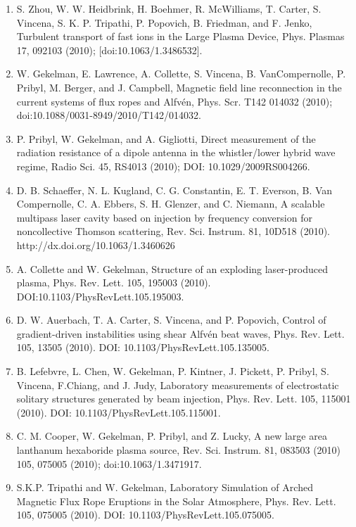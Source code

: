 \documentclass[11pt]{article}
\begin{document}
\begin{enumerate}
\item S. Zhou, W. W. Heidbrink, H. Boehmer, R. McWilliams, T. Carter, S. Vincena, S. K. P. Tripathi, P. Popovich, B. Friedman, and F. Jenko, Turbulent transport of fast ions in the Large Plasma Device, Phys. Plasmas 17, 092103 (2010); [doi:10.1063/1.3486532].

\item  W. Gekelman, E. Lawrence, A. Collette, S. Vincena, B. VanCompernolle, P. Pribyl, M. Berger, and J. Campbell, Magnetic field line reconnection in the current systems of flux ropes and Alfv\'{e}n, Phys. Scr. T142 014032 (2010); doi:10.1088/0031-8949/2010/T142/014032.

\item  P. Pribyl, W. Gekelman, and A. Gigliotti, Direct measurement of the radiation resistance of a dipole antenna in the whistler/lower hybrid wave regime, Radio Sci. 45, RS4013 (2010); DOI: 10.1029/2009RS004266.

\item  D. B. Schaeffer, N. L. Kugland, C. G. Constantin, E. T. Everson, B. Van Compernolle, C. A. Ebbers, S. H. Glenzer, and C. Niemann, A scalable multipass laser cavity based on injection by frequency conversion for noncollective Thomson scattering, Rev. Sci. Instrum. 81, 10D518 (2010).  http://dx.doi.org/10.1063/1.3460626

\item  A. Collette and W. Gekelman, Structure of an exploding laser-produced plasma, Phys. Rev. Lett. 105, 195003 (2010). DOI:10.1103/PhysRevLett.105.195003.

\item  D. W. Auerbach, T. A. Carter, S. Vincena, and P. Popovich, Control of gradient-driven instabilities using shear Alfv\'{e}n beat waves, Phys. Rev. Lett. 105, 13505 (2010). DOI: 10.1103/PhysRevLett.105.135005.

\item  B. Lefebvre, L. Chen, W. Gekelman, P. Kintner, J. Pickett, P. Pribyl, S. Vincena, F.Chiang, and J. Judy, Laboratory measurements of electrostatic solitary structures generated by beam injection, Phys. Rev. Lett. 105, 115001 (2010). DOI: 10.1103/PhysRevLett.105.115001.

\item  C. M. Cooper, W. Gekelman, P. Pribyl, and Z. Lucky, A new large area lanthanum hexaboride plasma source, Rev. Sci. Instrum. 81, 083503 (2010) 105, 075005 (2010); doi:10.1063/1.3471917.

\item   S.K.P. Tripathi and W. Gekelman, Laboratory Simulation of Arched Magnetic Flux Rope Eruptions in the Solar Atmosphere, Phys. Rev. Lett. 105, 075005 (2010). DOI: 10.1103/PhysRevLett.105.075005.


\end{enumerate}
\end{document}
